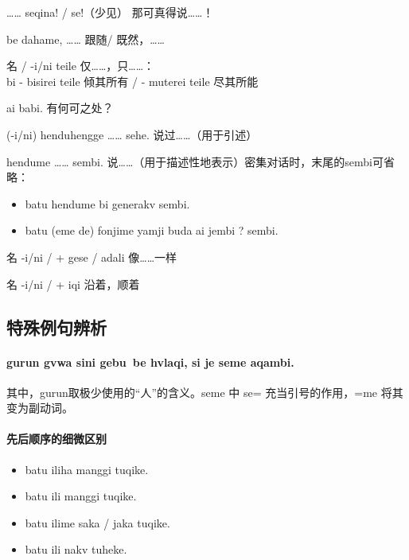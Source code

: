 \begin{des}
    \item[…… seqina! / se!（少见）] 那可真得说……！ 
    \item[\A be dahame, ……] 跟随\A / 既然\A ，……
    \item[名 / \V\ftn{形} -i/ni teile] 仅……，只……：\\
        \irg bi - bisirei teile 倾其所有 /  - muterei teile 尽其所能  
    \item[ai \V\ftn{形} babi.]有何可\V 之处？
    \item[\A (-i/ni) henduhengge …… sehe.] \A 说过……（用于引述）
    \item[\A hendume …… sembi.] \A 说……（用于描述性地表示）密集对话时，末尾的sembi可省略：
    \begin{itemize}
        \item batu hendume bi generakv sembi.
        \item batu (eme de) fonjime yamji buda ai jembi ? sembi.
    \end{itemize}
    \item[名 -i/ni / \V\ftn{形} + gese / adali]像……一样
    \item[名 -i/ni / \V\ftn{形} + iqi] 沿着，顺着
\end{des}




\subsection{特殊例句辨析}

\paragraph{gurun gvwa sini gebu~be hvlaqi, si je seme  aqambi.} 其中，gurun取极少使用的“人”的含义。seme 中 se= 充当引号的作用，=me 将其变为副动词。

\paragraph{先后顺序的细微区别}

\begin{itemize}
    \item batu iliha manggi tuqike.
    \item batu ili manggi tuqike.
    \item batu ilime saka / jaka tuqike.
    \item batu ili nakv tuheke.
\end{itemize}


